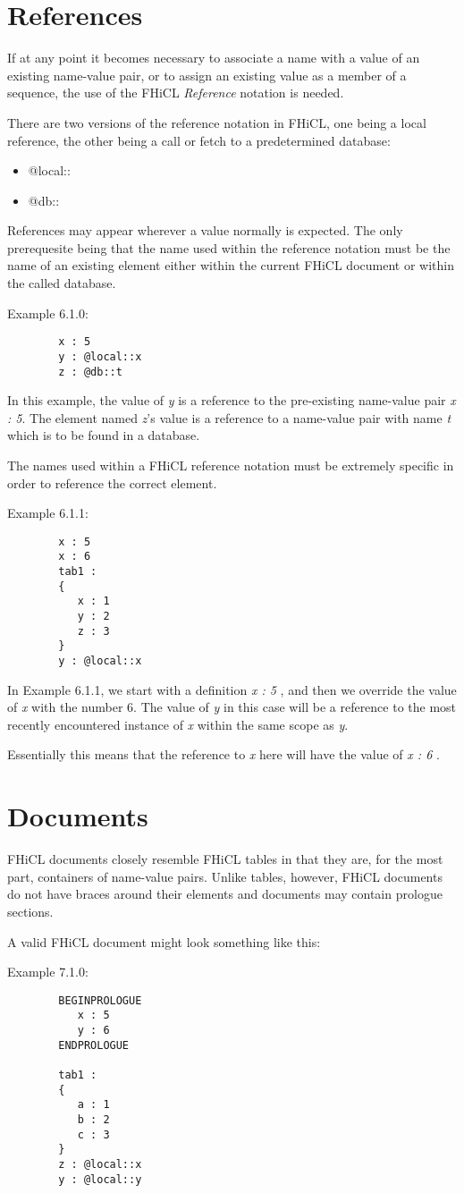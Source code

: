 \documentclass{article}
\begin{document}
\section{References}
	If at any point it becomes necessary to associate a name with a value of an existing name-value pair, or to 
	assign an existing value as a member of a sequence,
	the use of the FHiCL \emph{Reference} notation is needed.
	\par
	There are two versions of the reference notation in FHiCL, one being a local reference, 
	the other being a call or fetch to a predetermined database:
	\begin{itemize}
		\item @local::
		\item @db::
	\end{itemize}
	\par
	References may appear wherever a value normally is expected.
	The only prerequesite being that the name used within the reference notation must be the name of an existing element
	either within the current FHiCL document
	or within the called database.
	\par
	Example 6.1.0:
	\begin{verbatim}
		x : 5
		y : @local::x
		z : @db::t
	\end{verbatim}
	\par
	In this example, the value of \emph{y} is a reference to the pre-existing name-value pair \emph{x : 5}.
	The element named \emph{z}'s value is a reference to a name-value pair with name \emph{t} 
	which is to be found in a database.
	\par
	The names used within a FHiCL reference notation must be extremely specific in order to reference the correct element.
	\par
	Example 6.1.1:
	\begin{verbatim}
		x : 5
		x : 6
		tab1 :
		{
		   x : 1
		   y : 2
		   z : 3
		}
		y : @local::x
	\end{verbatim}
	\par
	In Example 6.1.1, we start with a definition \emph{ x : 5 },
	and then we override the value of \emph{x} with the number 6.
	The value of \emph{y} in this case will be a reference to the
	most recently encountered instance of \emph{x} within the same scope
	as \emph{y}.
	\par
	Essentially this means that the reference to \emph{x} here will have the value
	of \emph{ x : 6 }.
\section{Documents}
	FHiCL documents closely resemble FHiCL tables in that they are, for the most part,
	containers of name-value pairs.
	Unlike tables, however, FHiCL documents do not have braces around their elements
	and documents may contain prologue sections.
	\par
	A valid FHiCL document might look something like this:
	\par
	Example 7.1.0:
	\begin{verbatim}
		BEGINPROLOGUE
		   x : 5
		   y : 6
		ENDPROLOGUE
		
		tab1 :
		{
		   a : 1
		   b : 2
		   c : 3
   		}
		z : @local::x
		y : @local::y
	\end{verbatim}
\end{document}
